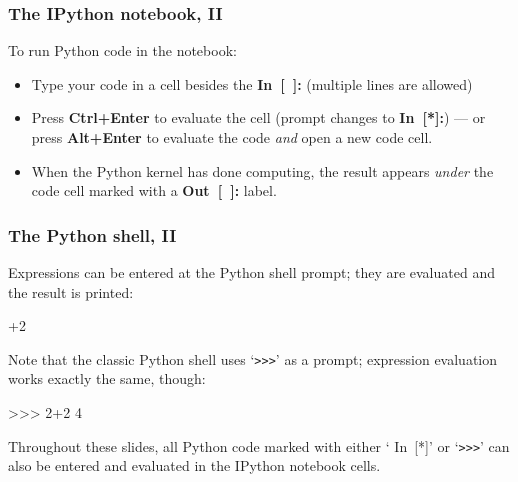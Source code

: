 \documentclass[english,serif,mathserif,xcolor=pdftex,dvipsnames,table]{beamer}
\begin{document}
\begin{frame}
  \frametitle{The IPython notebook, II}

  To run Python code in the notebook:
  \begin{itemize}
  \item Type your code in a cell besides the {\ttfamily\bfseries\color{blue}
      In~[~]:} (multiple lines are allowed)
  \item Press \textbf{Ctrl+Enter} to evaluate the cell (prompt changes to
    {\ttfamily\bfseries\color{blue} In~[*]:}) --- or press \textbf{Alt+Enter} to
    evaluate the code \emph{and} open a new code cell.
  \item When the Python kernel has done computing, the result appears \emph{under} the
    code cell marked with a {\ttfamily\bfseries\color{red} Out~[~]:} label.
  \end{itemize}

\end{frame}


\begin{frame}
  \frametitle{The Python shell, II}
  \smaller

  Expressions can be entered at the Python shell prompt; they are evaluated and the
  result is printed:
\begin{semiverbatim}
+2
\end{semiverbatim}

  \+ Note that the classic Python shell uses `\texttt{>{}>{}>}' as a prompt;
  expression evaluation works exactly the same, though:
\begin{semiverbatim}
>{}>{}> 2+2
4
\end{semiverbatim}

  \+ Throughout these slides, all Python code marked with either `{\color{blue}
    In~[*]}' or `\texttt{>{}>{}>}' can also be entered and evaluated in the IPython
  notebook cells.
\end{frame}
\end{document}
